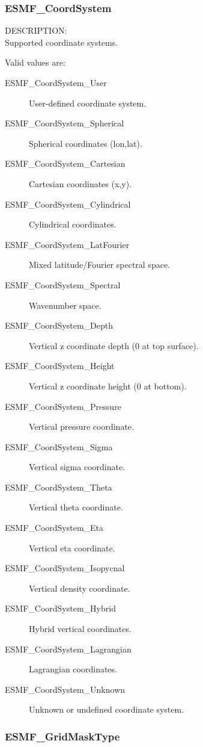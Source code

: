 \subsubsection{ESMF\_CoordSystem}

{\sf DESCRIPTION:\\}
Supported coordinate systems.

Valid values are:
\begin{description}
   \item [ESMF\_CoordSystem\_User]
         User-defined coordinate system.
   \item [ESMF\_CoordSystem\_Spherical]
         Spherical coordinates (lon,lat).
   \item [ESMF\_CoordSystem\_Cartesian]
         Cartesian coordinates (x,y).
   \item [ESMF\_CoordSystem\_Cylindrical] 
         Cylindrical coordinates.
   \item [ESMF\_CoordSystem\_LatFourier]
         Mixed latitude/Fourier spectral space.
   \item [ESMF\_CoordSystem\_Spectral]
         Wavenumber space.
   \item [ESMF\_CoordSystem\_Depth]
         Vertical z coordinate depth (0 at top surface).
   \item [ESMF\_CoordSystem\_Height]
         Vertical z coordinate height (0 at bottom).
   \item [ESMF\_CoordSystem\_Pressure]
         Vertical pressure coordinate.
   \item [ESMF\_CoordSystem\_Sigma] 
         Vertical sigma coordinate.
   \item [ESMF\_CoordSystem\_Theta]
         Vertical theta coordinate.
   \item [ESMF\_CoordSystem\_Eta]
         Vertical eta coordinate.
   \item [ESMF\_CoordSystem\_Isopycnal]
         Vertical density coordinate.
   \item [ESMF\_CoordSystem\_Hybrid]
         Hybrid vertical coordinates.
   \item [ESMF\_CoordSystem\_Lagrangian] 
         Lagrangian coordinates.
   \item [ESMF\_CoordSystem\_Unknown]
         Unknown or undefined coordinate system.
\end{description}

\subsubsection{ESMF\_GridMaskType}

